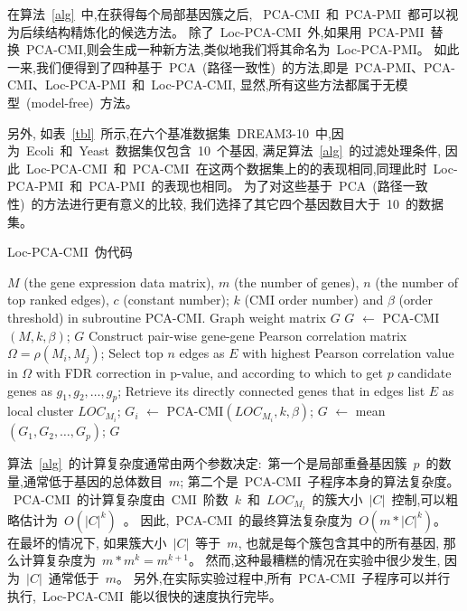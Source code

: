 在算法~\ref{alg}~中,在获得每个局部基因簇之后,
~PCA-CMI~和~PCA-PMI~都可以视为后续结构精炼化的候选方法。
除了~Loc-PCA-CMI~外,如果用~PCA-PMI~替换~PCA-CMI,则会生成一种新方法,类似地我们将其命名为~Loc-PCA-PMI。
如此一来,我们便得到了四种基于~PCA~(路径一致性)~的方法,即是~PCA-PMI、PCA-CMI、Loc-PCA-PMI~和~Loc-PCA-CMI,
显然,所有这些方法都属于无模型~(model-free)~方法。

另外, 如表~\ref{tbl}~所示,在六个基准数据集~DREAM3-10~中,因为~Ecoli~和~Yeast~数据集仅包含~10~个基因,
满足算法~\ref{alg}~的过滤处理条件,
因此~Loc-PCA-CMI~和~PCA-CMI~在这两个数据集上的的表现相同,同理此时~Loc-PCA-PMI~和~PCA-PMI~的表现也相同。
为了对这些基于~PCA~(路径一致性)~的方法进行更有意义的比较,
我们选择了其它四个基因数目大于~10~的数据集。

\begin{algorithm}[!htbp]
    \caption{Loc-PCA-CMI~伪代码}
    \label{alg}
    \begin{algorithmic}[1]
    \Require $M$ (the gene expression data matrix), $m$ (the number of genes), $n$ (the number of top ranked edges), $c$ (constant number); $k$ (CMI order number) and $\beta$ (order threshold) in subroutine PCA-CMI.
    \Ensure Graph weight matrix $G$ 
    \State $G$ $\leftarrow$ PCA-CMI$(M, k, \beta)$;
    \State \Return $G$
    \Else
    \State Construct pair-wise gene-gene Pearson correlation matrix $\Omega = \rho(M_i, M_j)$;
    \State Select top $n$ edges as $E$ with highest Pearson correlation value in $\Omega$ with FDR correction in p-value, and according to which to get 
    $p$ candidate genes as $g_1,g_2,\ldots,g_{p}$;
      \State Retrieve its directly connected genes that in edges list $E$ as local cluster $LOC_{M_i}$;
    \EndFor
      \State $G_{i}$ $\leftarrow$ PCA-CMI$(LOC_{M_i}, k, \beta)$;
    \EndFor
    \State $G$ $\leftarrow$ mean$(G_{1},G_{2},\ldots,G_{p})$;
    \State \Return $G$ 
    \EndIf
    \end{algorithmic}
\end{algorithm}

算法~\ref{alg}~的计算复杂度通常由两个参数决定:~第一个是局部重叠基因簇~$p$~的数量,通常低于基因的总体数目~$m$; 第二个是~PCA-CMI~子程序本身的算法复杂度。
~PCA-CMI~的计算复杂度由~CMI~阶数~$k$~和~$LOC_{M_i}$~的簇大小~$|C|$~控制,可以粗略估计为~$O(|C|^k)$~。
因此,~PCA-CMI~的最终算法复杂度为~$O(m *|C|^k)$。
在最坏的情况下, 如果簇大小~$|C|$~等于~$m$, 也就是每个簇包含其中的所有基因, 那么计算复杂度为~$m*m^k = m^{k+1}$。 
然而,这种最糟糕的情况在实验中很少发生, 因为~$|C|$~通常低于~$m$。
另外,在实际实验过程中,所有~PCA-CMI~子程序可以并行执行,~Loc-PCA-CMI~能以很快的速度执行完毕。


